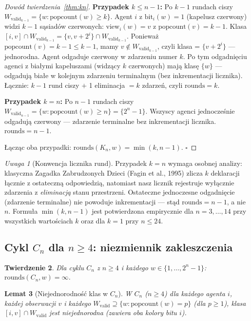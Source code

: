 \documentclass[12pt,a4paper]{article}
\theoremstyle{plain}
\newtheorem{theorem}{Twierdzenie}[section]
\newtheorem{lemma}[theorem]{Lemat}
\theoremstyle{definition}
\theoremstyle{remark}
\newtheorem{remark}[theorem]{Uwaga}
\newcommand{\rounds}{\mathrm{rounds}}
\newcommand{\popcount}{\mathrm{popcount}}
\newcommand{\view}{\mathrm{view}}
\newcommand{\Wval}{W_{\mathrm{valid}}}
\begin{document}
\begin{proof}[Dowód twierdzenia~\ref{thm:kn}]
\textbf{Przypadek $k \le n-1$:} Po $k-1$ rundach ciszy $\Wval_{k-1} = \{w : \popcount(w) \ge k\}$. Agent $i$ z $\mathrm{bit}_i(w) = 1$ (kapelusz czerwony) widzi $k-1$ sąsiadów czerwonych: $\view_i(w) = v$ z $\popcount(v) = k-1$. Klasa $[i,v] \cap \Wval_{k-1} = \{v, v+2^i\} \cap \Wval_{k-1}$. Ponieważ $\popcount(v) = k-1 \le k-1$, mamy $v \notin \Wval_{k-1}$, czyli klasa = $\{v+2^i\}$ — jednorodna. Agent odgaduje czerwony w zdarzeniu numer $k$. Po tym odgadnięciu agenci z białymi kapeluszami (widzący $k$ czerwonych) mają klasę $\{w\}$ — odgadują białe w kolejnym zdarzeniu terminalnym (bez inkrementacji licznika). Łącznie: $k{-}1$ rund ciszy $+$ 1 eliminacja $= k$ zdarzeń, czyli $\rounds = k$.

\textbf{Przypadek $k = n$:} Po $n-1$ rundach ciszy $\Wval_{n-1} = \{w : \popcount(w) \ge n\} = \{2^n{-}1\}$. Wszyscy agenci jednocześnie odgadują czerwony — zdarzenie terminalne bez inkrementacji licznika. $\rounds = n-1$.

Łącząc oba przypadki: $\rounds(K_n,w) = \min(k, n-1)$. $\square$
\end{proof}

\begin{remark}[Konwencja licznika rund]
Przypadek $k = n$ wymaga osobnej analizy: klasyczna Zagadka Zabrudzonych Dzieci (Fagin et al., 1995) zlicza $k$ deklaracji łącznie z ostateczną odpowiedzią, natomiast nasz licznik rejestruje wyłącznie zdarzenia z \emph{eliminacją} stanu przestrzeni. Ostateczne jednoczesne odgadnięcie (zdarzenie terminalne) nie powoduje inkrementacji — stąd $\rounds = n{-}1$, a nie $n$. Formuła $\min(k,n-1)$ jest potwierdzona empirycznie dla $n = 3,\ldots,14$ przy wszystkich wartościach $k$ oraz dla $k=1$ przy $n \le 24$.
\end{remark}

\subsection{Cykl $C_n$ dla $n \ge 4$: niezmiennik zakleszczenia}
\label{sec:proof_cn}

\begin{theorem}
\label{thm:cn}
Dla cyklu $C_n$ z $n \ge 4$ i każdego $w \in \{1,\ldots,2^n{-}1\}$: $\rounds(C_n,w) = \infty$.
\end{theorem}

\begin{lemma}[Niejednorodność klas w $C_n$]
\label{lem:cn_classes}
W $C_n$ ($n \ge 4$) dla każdego agenta $i$, każdej obserwacji $v$ i każdego $\Wval \supseteq \{w : \popcount(w) = p\}$ (dla $p \ge 1$), klasa $[i,v] \cap \Wval$ jest niejednorodna (zawiera oba kolory bitu $i$).
\end{lemma}
\end{document}

